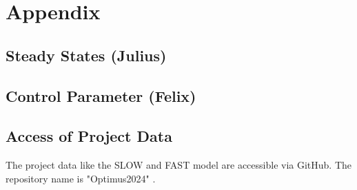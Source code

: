 \chapter{Appendix}
\section{Steady States (Julius)}

\newpage
\section{Control Parameter (Felix)}\label{Control Parameters}

\section{Access of Project Data}
The project data like the \gls{SLOW} and \gls{FAST} model are accessible via GitHub. The repository name is "Optimus2024" \cite{OptimusGitHub}. 

